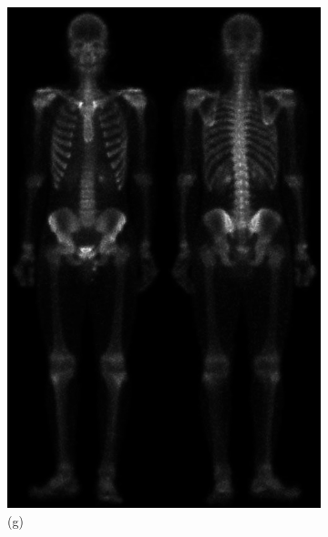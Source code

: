 \begin{figure}[h!]
\begin{subfigure}[b]{0.4\linewidth}
		\includegraphics[width=\linewidth]{myfigure/p2/2-g.png}
		\caption*{(g)}
		\label{fig:2g}
	\end{subfigure}
	\begin{subfigure}[b]{0.4\linewidth}

\end{subfigure}
\end{figure}
